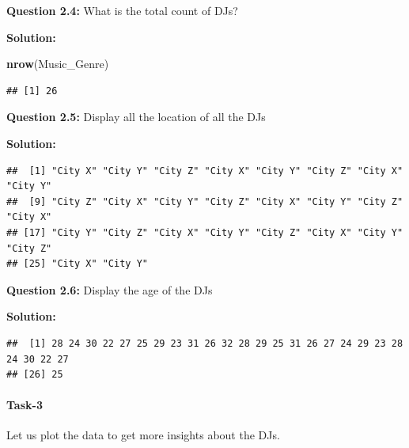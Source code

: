 \documentclass[
]{article}
\newenvironment{Shaded}{\begin{snugshade}}{\end{snugshade}}
\newcommand{\FunctionTok}[1]{\textcolor[rgb]{0.13,0.29,0.53}{\textbf{#1}}}
\newcommand{\NormalTok}[1]{#1}
\newcommand{\SpecialCharTok}[1]{\textcolor[rgb]{0.81,0.36,0.00}{\textbf{#1}}}
\begin{document}
\textbf{Question 2.4:} What is the total count of DJs?

\textbf{Solution:}

\begin{Shaded}
\begin{Highlighting}[]
\FunctionTok{nrow}\NormalTok{(Music\_Genre)}
\end{Highlighting}
\end{Shaded}

\begin{verbatim}
## [1] 26
\end{verbatim}

\textbf{Question 2.5:} Display all the location of all the DJs

\textbf{Solution:}

\begin{Shaded}
\end{Shaded}

\begin{verbatim}
##  [1] "City X" "City Y" "City Z" "City X" "City Y" "City Z" "City X" "City Y"
##  [9] "City Z" "City X" "City Y" "City Z" "City X" "City Y" "City Z" "City X"
## [17] "City Y" "City Z" "City X" "City Y" "City Z" "City X" "City Y" "City Z"
## [25] "City X" "City Y"
\end{verbatim}

\textbf{Question 2.6:} Display the age of the DJs

\textbf{Solution:}

\begin{Shaded}
\end{Shaded}

\begin{verbatim}
##  [1] 28 24 30 22 27 25 29 23 31 26 32 28 29 25 31 26 27 24 29 23 28 24 30 22 27
## [26] 25
\end{verbatim}

\hypertarget{task-3}{%
\paragraph{Task-3}\label{task-3}}

Let us plot the data to get more insights about the DJs.
\end{document}
